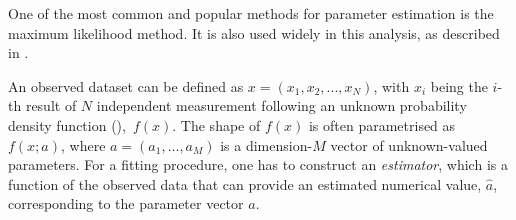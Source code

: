 One of the most common and popular methods for parameter estimation is the maximum likelihood method. 
It is also used widely in this analysis, as described in .

An observed dataset can be defined as $x = (x_1, x_2,...,x_N)$, with $x_i$ being the $i$-th result of $N$ independent measurement following an unknown probability density function (\PDF),~$f(x)$.
The shape of $f(x)$ is often parametrised as $f(x; a)$, where $a=(a_1,...,a_M)$ is a dimension-$M$ vector of unknown-valued parameters. 
For a fitting procedure, one has to construct an \textit{estimator}, which is a function of the observed data that can provide an estimated numerical value, $\hat{a}$, corresponding to the parameter vector $a$.


